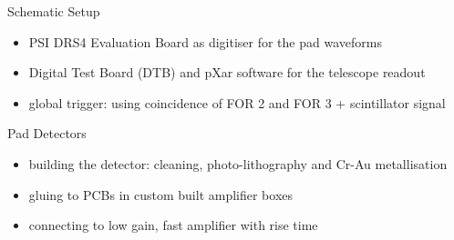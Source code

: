 \begin{frame}{Schematic Setup}
 
	\vspace*{-10pt}\vspace*{-10pt}
 
	\begin{itemize}\itemfill
		\item PSI DRS4 Evaluation Board as digitiser for the pad waveforms
		\item Digital Test Board (DTB) and pXar software for the telescope readout
		\item global trigger: using coincidence of FOR 2 and FOR 3 + scintillator signal
	\end{itemize}

\end{frame}
\begin{frame}{Pad Detectors}

	\vspace*{-10pt}\vspace*{-5pt}
	
	\begin{itemize}\itemfill
		\item building the detector: cleaning, photo-lithography and Cr-Au metallisation
		\item gluing to PCBs in custom built amplifier boxes
		\item connecting to low gain, fast amplifier with  rise time
	\end{itemize}
	
\end{frame}